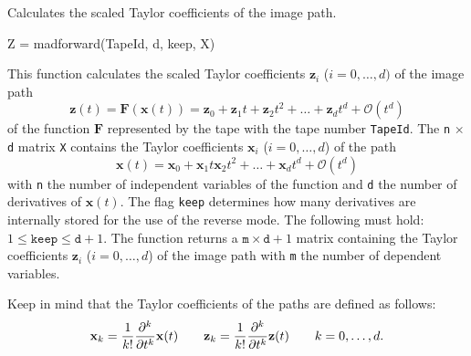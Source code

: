 



\begin{Purpose}
Calculates the scaled Taylor coefficients of the image path.
\end{Purpose}


\begin{Synopsis}
Z = madforward(TapeId, d, keep, X)
\end{Synopsis}


\begin{Description}
This function calculates the scaled Taylor coefficients $\mathbf{z}_i$ ($i=0,\ldots,d)$ of the image path 
\begin{equation*}
\mathbf{z}(t) = \mathbf{F}(\mathbf{x}(t)) = \mathbf{z}_0 + \mathbf{z}_1 t + \mathbf{z}_2 t^2 + \ldots + \mathbf{z}_d t^d + \mathcal{O}(t^d)
\end{equation*}
of the function $\mathbf{F}$ represented by the tape with the tape number \texttt{TapeId}. The \texttt{n} $\times$ \texttt{d} matrix \texttt{X} contains the Taylor coefficients $\mathbf{x}_i$ ($i=0,\ldots,d$) of the path 
\begin{equation*}
\mathbf{x}(t) = \mathbf{x}_0 + \mathbf{x}_1 t \mathbf{x}_2 t^2 + \ldots + \mathbf{x}_d t^d + \mathcal{O}(t^d)
\end{equation*}
with \texttt{n} the number of independent variables of the function and \texttt{d} the number of derivatives of $\mathbf{x}(t)$. The flag \texttt{keep} determines how many derivatives are internally stored for the use of the reverse mode. The following must hold: $1 \leq \mathtt{keep} \leq \mathtt{d}+1$. The function returns a $\mathtt{m} \times \mathtt{d}+1$ matrix containing the Taylor coefficients $\mathbf{z}_i$ ($i=0,\ldots,d$) of the image path with \texttt{m} the number of dependent variables.

Keep in mind that the Taylor coefficients of the paths are defined as follows:
\begin{equation*}
\mathbf{x}_k = \frac{1}{k!}\frac{\partial ^k}{\partial t^k}\mathbf{x}(t) \qquad \mathbf{z}_k = \frac{1}{k!}\frac{\partial ^k}{\partial t^k}\mathbf{z}(t) \qquad k = 0, \ldots, d.
\end{equation*}
\end{Description}


